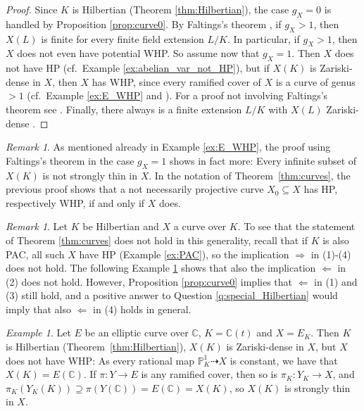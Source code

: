 \documentclass[10pt,a4paper]{amsart}
\theoremstyle{plain}
\theoremstyle{remark}
\newtheorem{remark}[theorem]{Remark}
\newtheorem{example}[theorem]{Example}
\numberwithin{theorem}{section}
\begin{document}
\begin{proof}
Since $K$ is Hilbertian (Theorem \ref{thm:Hilbertian}), the case $g_X=0$ is handled by Proposition \ref{prop:curve0}.
By Faltings's theorem \cite{Faltings}, if $g_X>1$, then $X(L)$ is finite for every finite field extension $L/K$.
In particular, 
if $g_X>1$, then $X$ does not even have potential WHP. 
So assume now that $g_X=1$.
Then $X$ does not have HP (cf.~Example \ref{ex:abelian_var_not_HP}),
but if $X(K)$ is Zariski-dense in $X$, then $X$ has WHP,
since every ramified cover of $X$ is a curve of genus $>1$ (cf.~Example \ref{ex:E_WHP} and \cite[\S2.1]{CZ}). For a proof not involving Faltings's theorem see \cite[Theorem 2]{Zannier}.
Finally, there always is a finite extension $L/K$ with $X(L)$ Zariski-dense
\cite{FreyJarden}.  
\end{proof}

\begin{remark}\label{rem:curve_Faltings}
As mentioned already in Example \ref{ex:E_WHP},
the proof using Faltings's theorem 
in the case $g_X=1$
shows in fact more:
Every infinite subset of $X(K)$ is not strongly thin in $X$.
In the notation of Theorem~\ref{thm:curves}, 
the previous proof shows that 
a not necessarily projective curve $X_0\subseteq X$
has HP, respectively WHP, if and only if $X$ does.  
\end{remark}
 
\begin{remark}
Let $K$ be Hilbertian and $X$ a 
curve over $K$.
To see that the statement of Theorem \ref{thm:curves} does not hold 
in this generality,
recall that if $K$ is also PAC,
all such $X$ have HP (Example \ref{ex:PAC}),
so the implication $\Rightarrow$ in (1)-(4) does not hold.
The following Example \ref{ex:E_over_Ct} shows that also the implication $\Leftarrow$ in (2) does not hold.
However, 
Proposition \ref{prop:curve0} implies that $\Leftarrow$ in (1) and (3)
still hold,
and a positive answer to Question \ref{q:special_Hilbertian} would imply
that also $\Leftarrow$ in (4) holds in general.
\end{remark}

\begin{example}\label{ex:E_over_Ct}
Let $E$ be an elliptic curve over $\mathbb{C}$, 
$K=\mathbb{C}(t)$
and $X=E_K$.
Then $K$ is Hilbertian (Theorem~\ref{thm:Hilbertian}),
$X(K)$ is Zariski-dense in $X$,
but $X$ does not have WHP:
As every rational map $\mathbb{P}^1_K\dashrightarrow X$ is constant, we have that
$X(K)=E(\mathbb{C})$. 
If $\pi\colon Y\to E$ is any ramified cover, then so is $\pi_K\colon Y_K\to X$,
and $\pi_K(Y_K(K))\supseteq \pi(Y(\mathbb{C}))=E(\mathbb{C})=X(K)$,
so $X(K)$ is strongly thin in $X$.
\end{example}
\end{document}
